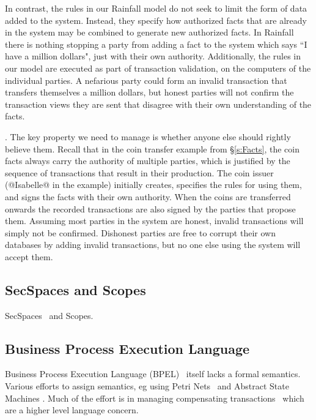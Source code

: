 In contrast, the rules in our Rainfall model do not seek to limit the form of data added to the system. Instead, they specify how authorized facts that are already in the system may be combined to generate new authorized facts. In Rainfall there is nothing stopping a party from adding a fact to the system which says ``I have a million dollars", just with their own authority. Additionally, the rules in our model are executed as part of transaction validation, on the computers of the individual parties. A nefarious party could form an invalid transaction that transfers themselves a million dollars, but honest parties will not confirm the transaction views they are sent that disagree with their own understanding of the facts.

. The key property we need to manage is whether anyone else should rightly believe them. Recall that in the coin transfer example from \S\ref{s:Facts}, the coin facts always carry the authority of multiple parties, which is justified by the sequence of transactions that result in their production. The coin issuer (@Isabelle@ in the example) initially creates, specifies the rules for using them, and signs the facts with their own authority. When the coins are transferred onwards the recorded transactions are also signed by the parties that propose them. Assuming most parties in the system are honest, invalid transactions will simply not be confirmed. Dishonest parties are free to corrupt their own databases by adding invalid transactions, but no one else using the system will accept them.

\subsection{SecSpaces and Scopes}
SecSpaces~\cite{Busi2003:SecSpaces} and Scopes.






\subsection{Business Process Execution Language}
Business Process Execution Language (BPEL)~\cite{Andrews2003:BPEL} itself lacks a formal semantics. Various efforts to assign semantics, eg using Petri Nets~\cite{Lohmann2009:PetriBPEL} and Abstract State Machines \cite{Fahland2005:SemanticsBPEL}. Much of the effort is in managing compensating transactions~\cite{Colombo2011:Compensating} which are a higher level language concern.


